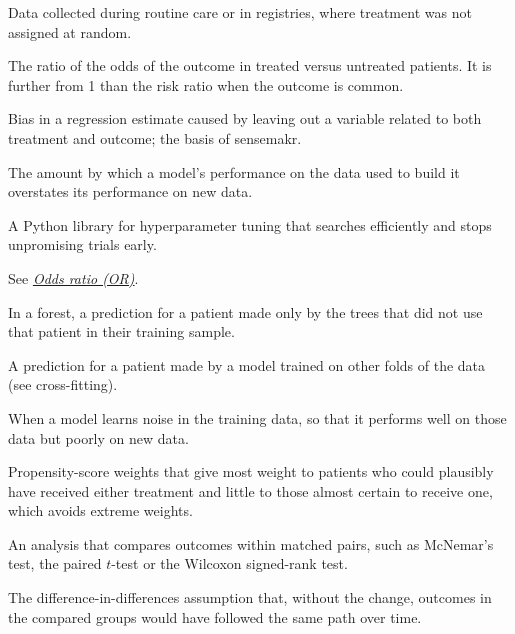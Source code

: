 \begin{description}[style=nextline, leftmargin=1.2em, itemsep=3pt, font=\normalfont\bfseries]
\item[Observational data]
Data collected during routine care or in registries, where treatment was not assigned at random.

\item[Odds ratio (OR)]\label{gl:or}
The ratio of the odds of the outcome in treated versus untreated patients. It is further from 1 than the risk ratio when the outcome is common.

\item[Omitted variable bias]
Bias in a regression estimate caused by leaving out a variable related to both treatment and outcome; the basis of sensemakr.

\item[Optimism]
The amount by which a model's performance on the data used to build it overstates its performance on new data.

\item[Optuna]
A Python library for hyperparameter tuning that searches efficiently and stops unpromising trials early.

\item[OR]
See \emph{\hyperref[gl:or]{Odds ratio (OR)}}.

\item[Out-of-bag estimate]
In a forest, a prediction for a patient made only by the trees that did not use that patient in their training sample.

\item[Out-of-fold prediction]
A prediction for a patient made by a model trained on other folds of the data (see cross-fitting).

\item[Overfitting]
When a model learns noise in the training data, so that it performs well on those data but poorly on new data.

\item[Overlap weights]
Propensity-score weights that give most weight to patients who could plausibly have received either treatment and little to those almost certain to receive one, which avoids extreme weights.

\item[Paired analysis]
An analysis that compares outcomes within matched pairs, such as McNemar's test, the paired $t$-test or the Wilcoxon signed-rank test.

\item[Parallel trends]
The difference-in-differences assumption that, without the change, outcomes in the compared groups would have followed the same path over time.


\end{description}

